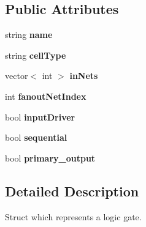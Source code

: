 \subsection*{Public Attributes}
\begin{DoxyCompactItemize}
\item 
\hypertarget{structCircuit__Netlist_1_1Logic__Gate_aa780fa4baf5244fcf34c52053005f73a}{string {\bfseries name}}\label{structCircuit__Netlist_1_1Logic__Gate_aa780fa4baf5244fcf34c52053005f73a}

\item 
\hypertarget{structCircuit__Netlist_1_1Logic__Gate_a3b48b229126233bf5a98f39b003e7e5a}{string {\bfseries cell\-Type}}\label{structCircuit__Netlist_1_1Logic__Gate_a3b48b229126233bf5a98f39b003e7e5a}

\item 
\hypertarget{structCircuit__Netlist_1_1Logic__Gate_a0ada4f530d1846973daed17e35eb10a7}{vector$<$ int $>$ {\bfseries in\-Nets}}\label{structCircuit__Netlist_1_1Logic__Gate_a0ada4f530d1846973daed17e35eb10a7}

\item 
\hypertarget{structCircuit__Netlist_1_1Logic__Gate_ac77535e3e3fff92529fa21d711cd0487}{int {\bfseries fanout\-Net\-Index}}\label{structCircuit__Netlist_1_1Logic__Gate_ac77535e3e3fff92529fa21d711cd0487}

\item 
\hypertarget{structCircuit__Netlist_1_1Logic__Gate_ad08611514342cd0293640fac9eebc61a}{bool {\bfseries input\-Driver}}\label{structCircuit__Netlist_1_1Logic__Gate_ad08611514342cd0293640fac9eebc61a}

\item 
\hypertarget{structCircuit__Netlist_1_1Logic__Gate_a3919c593d1a40b4467d6735be783eee6}{bool {\bfseries sequential}}\label{structCircuit__Netlist_1_1Logic__Gate_a3919c593d1a40b4467d6735be783eee6}

\item 
\hypertarget{structCircuit__Netlist_1_1Logic__Gate_a475c5b2598538600935f66be43c163fa}{bool {\bfseries primary\-\_\-output}}\label{structCircuit__Netlist_1_1Logic__Gate_a475c5b2598538600935f66be43c163fa}

\end{DoxyCompactItemize}


\subsection{Detailed Description}
Struct which represents a logic gate. 



